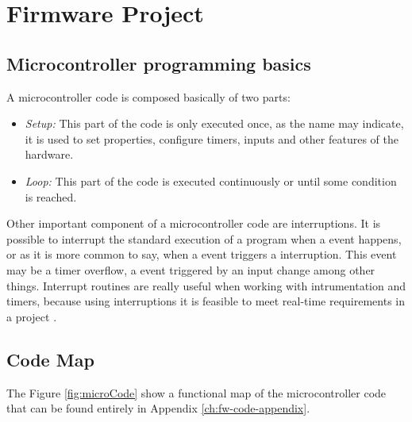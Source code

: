 \chapter{Firmware Project}\label{ch:software-project}

	\section{Microcontroller programming basics}\label{ssec:microcontroller-programming-basics}
		A microcontroller code is composed basically of two parts:
		
		\begin{itemize}
			\item \textit{Setup: } This part of the code is only executed once, as the name may indicate, it is used to set properties, configure timers, inputs and other features of the hardware.
			\item \textit{Loop: } This part of the code is executed continuously or until some condition is reached. 
		\end{itemize}
		
		\par
		
		Other important component of a microcontroller code are interruptions. It is possible to interrupt the standard execution of a program when a event happens, or as it is more common to say, when a event triggers a interruption. This event may be a timer overflow, a event triggered by an input change among other things. Interrupt routines are really useful when working with intrumentation and timers, because using interruptions it is feasible to meet real-time requirements in a project \cite{mukaro1999microcontroller}.
		
	\section{Code Map}\label{sec:microcontroller-code-map}
	
	The Figure \ref{fig:microCode} show a functional map of the microcontroller code that can be found entirely in Appendix \ref{ch:fw-code-appendix}.
	
